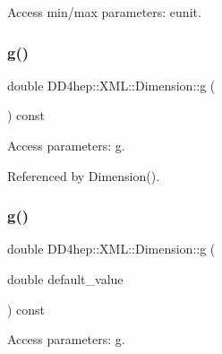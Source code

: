 Access min/max parameters\+: eunit. 

\hypertarget{struct_d_d4hep_1_1_x_m_l_1_1_dimension_ad4176a456a58f530d2daaf1ed5f7f9dc}{}\label{struct_d_d4hep_1_1_x_m_l_1_1_dimension_ad4176a456a58f530d2daaf1ed5f7f9dc} 
\subsubsection{\texorpdfstring{g()}{g()}\hspace{0.1cm}{\footnotesize\ttfamily [1/2]}}
{\footnotesize\ttfamily double D\+D4hep\+::\+X\+M\+L\+::\+Dimension\+::g (\begin{DoxyParamCaption}{ }\end{DoxyParamCaption}) const}



Access parameters\+: g. 



Referenced by Dimension().

\hypertarget{struct_d_d4hep_1_1_x_m_l_1_1_dimension_a4a319c6728e414c3932ab56c70f6e238}{}\label{struct_d_d4hep_1_1_x_m_l_1_1_dimension_a4a319c6728e414c3932ab56c70f6e238} 
\subsubsection{\texorpdfstring{g()}{g()}\hspace{0.1cm}{\footnotesize\ttfamily [2/2]}}
{\footnotesize\ttfamily double D\+D4hep\+::\+X\+M\+L\+::\+Dimension\+::g (\begin{DoxyParamCaption}\item[{double}]{default\+\_\+value }\end{DoxyParamCaption}) const}



Access parameters\+: g. 

\hypertarget{struct_d_d4hep_1_1_x_m_l_1_1_dimension_a7439fec443cacdd47697acf7680d3190}{}\label{struct_d_d4hep_1_1_x_m_l_1_1_dimension_a7439fec443cacdd47697acf7680d3190} 
